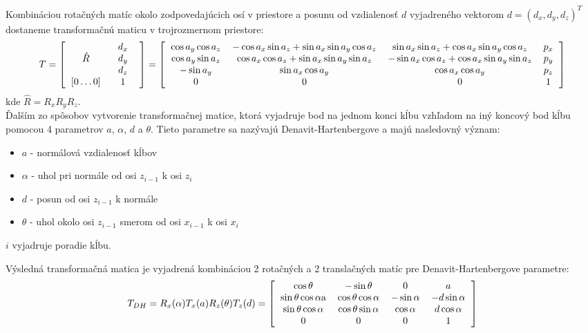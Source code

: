 Kombináciou rotačných matíc okolo zodpovedajúcich osí v priestore a posunu od vzdialenosť $d$ vyjadreného vektorom $d=(d_x, d_y, d_z)^T$ dostaneme transformačnú maticu v trojrozmernom priestore:
\begin{equation}
	T = \left[
	\begin{tabular}{cc}
		$\hat{R}$ & 
			\begin{tabular}{c}
				$d_x$ \\
				$d_y$ \\
				$d_z$
			\end{tabular} \\
		$[0\ldots0]$ & 1
	\end{tabular}
	\right] =
	\left[
	\begin{tabular}{cccc}
		$\cos a_y \cos a_z$ & $-\cos a_x \sin a_z + \sin a_x \sin a_y \cos a_z$ & $\sin a_x \sin a_z + \cos a_x  \sin a_y \cos a_z$ & $p_x$ \\
		$\cos a_y \sin a_z$ & $\cos a_x \cos a_z + \sin a_x \sin a_y \sin a_z$ & $-\sin a_x \cos a_z + \cos a_x \sin a_y \sin a_z$ & $p_y$ \\
		$-\sin a_y$ & $\sin a_x \cos a_y$ & $\cos a_x \cos a_y$ & $p_z$ \\
		0 & 0 & 0 & 1
	\end{tabular}
	\right]
\end{equation}
kde $\hat{R} = R_xR_yR_z$.
\\
Ďalším zo spôsobov vytvorenie transformačnej matice, ktorá vyjadruje bod na jednom konci kĺbu vzhľadom na iný koncový bod kĺbu pomocou 4 parametrov $a$, $\alpha$, $d$ a $\theta$. Tieto parametre sa nazývajú Denavit-Hartenbergove a majú nasledovný význam:
\begin{itemize}
	\item $a$ - normálová vzdialenosť kĺbov
	\item $\alpha$ - uhol pri normále od osi $z_{i-1}$ k osi $z_i$
	\item $d$ - posun od osi $z_{i-1}$ k normále
	\item $\theta$ - uhol okolo osi $z_{i-1}$ smerom od osi $x_{i-1}$ k osi $x_i$
\end{itemize}
$i$ vyjadruje poradie kĺbu.

Výsledná transformačná matica je vyjadrená kombináciou 2 rotačných a 2 translačných matíc pre Denavit-Hartenbergove parametre:
\begin{equation}
	T_{DH} = R_x(\alpha)T_x(a)R_z(\theta)T_z(d) =
	\left[
	\begin{tabular}{cccc}
		$\cos \theta$ & $-\sin \theta$ & $0$ & $a$ \\
		$\sin\theta\cos\alpha$a & $\cos\theta\cos\alpha$ & $-\sin\alpha$ & $-d\sin\alpha$ \\
		$\sin\theta\cos\alpha$ & $\cos\theta\sin\alpha$ & $\cos\alpha$ & $d\cos\alpha$ \\
		$0$ & $0$ & $0$ & $1$
	\end{tabular}
	\right]
\end{equation}

